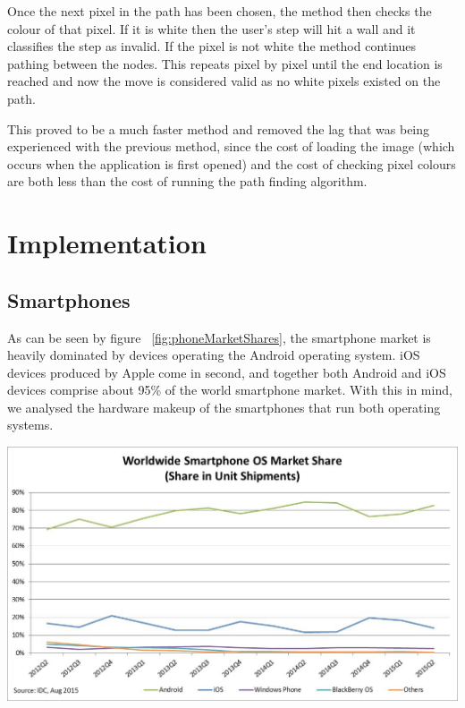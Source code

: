 \documentclass[12pt,a4paper]{report}
\begin{document}
Once the next pixel in the path has been chosen, the method then checks the colour of that pixel. If it is white then the user's step will hit a wall and it classifies the step as invalid. If the pixel is not white the method continues pathing between the nodes. This repeats pixel by pixel until the end location is reached and now the move is considered valid as no white pixels existed on the path.

This proved to be a much faster method and removed the lag that was being experienced with the previous method, since the cost of loading the image (which occurs when the application is first opened) and the cost of checking pixel colours are both less than the cost of running the path finding algorithm.

\chapter{Implementation}

\section{Smartphones}

As can be seen by figure ~\ref{fig:phoneMarketShares}, the smartphone market is heavily dominated by devices operating the Android operating system. iOS devices produced by Apple come in second, and together both Android and iOS devices comprise about 95\% of the world smartphone market. With this in mind, we analysed the hardware makeup of the smartphones that run both operating systems. \\

\begin{center}
\includegraphics[scale=0.7]{images/phoneMarketShare.png}
\label{fig:phoneMarketShares}
\end{center}
\end{document}
